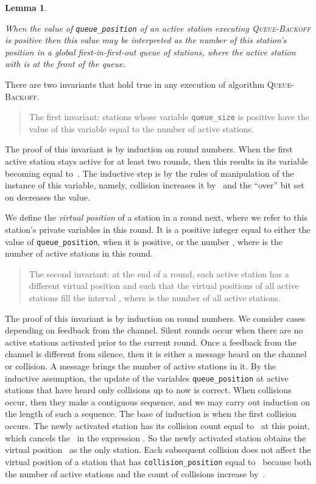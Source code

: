 \documentclass[11pt]{article}
\newcommand{\qed}{\hfill  \smallbreak}
\newenvironment{proof}{\noindent{\bf Proof:}}{\qed}
\newtheorem{lemma}{Lemma}
\begin{document}
\begin{lemma}
\label{lem:queue}

When the value of \emph{\texttt{queue\_position}} of an active station executing \textsc{Queue-Backoff} is positive then this value may be interpreted as the number of this station's position in a global first-in-first-out queue of stations, where the active station with  is at the front of the queue.
\end{lemma}

\begin{proof} 
There are two invariants that hold true in any execution of algorithm \textsc{Queue-Backoff}.
\begin{quote}
\textsf{The first invariant:} stations whose variable \texttt{queue\_size} is positive have the value of this variable equal to  the number of active stations.
\end{quote}
The proof of this invariant is by induction on round numbers.
When the first active station stays active for at least two rounds, then this results in its variable  becoming equal to~.
 The inductive step is by the rules of manipulation of the instance of this variable, namely, collision increases it by~  and the ``over'' bit set on decreases the value.

We define the \emph{virtual position} of a station in a round next, where we refer to this station's private variables in this round.
It is a positive integer equal to either the value of \texttt{queue\_position}, when it is positive, or the number , where  is the number of active stations in this round.

\begin{quote}
\textsf{The second invariant:} at the end of a round, each active station has a different virtual position and such that the virtual positions of all active stations fill the interval , where  is the number of all active stations.
 \end{quote}
The proof of this invariant is by induction on round numbers.
We consider cases depending on feedback from the channel.
Silent rounds occur when there are no active stations activated prior to the current round.
Once a feedback from the channel is different from silence, then it is either a message heard on the channel or collision.
A message brings the number of active stations in it.
By the inductive assumption, the update of the variables \texttt{queue\_position} at active stations that have heard only collisions up to now is correct.
When collisions occur, then they make a contiguous sequence, and we may carry out induction on the length of such a sequence.
The base of induction is when the first collision occurs.
The newly activated station has its collision count equal to~ at this point, which cancels the~ in the expression .
So the newly activated station obtains the virtual position~ as the only station.
Each subsequent collision does not affect the virtual position of a station that has  \texttt{collision\_position} equal to~ because both the number of active stations and  the count of collisions increase by~.


\end{proof}
\end{document}
